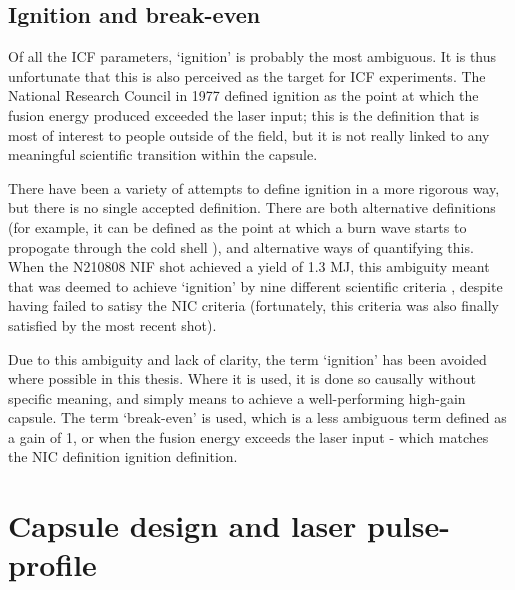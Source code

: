 
\subsection{Ignition and break-even}
Of all the ICF parameters, `ignition' is probably the most ambiguous. It is thus unfortunate that this is also perceived as the target for ICF experiments. The National Research Council in 1977 defined ignition as the point at which the fusion energy produced exceeded the laser input; this is the definition that is most of interest to people outside of the field, but it is not really linked to any meaningful scientific transition within the capsule.

There have been a variety of attempts to define ignition in a more rigorous way, but there is no single accepted definition. There are both alternative definitions (for example, it can be defined as the point at which a burn wave starts to propogate through the cold shell \cite{Christopherson2020}), and alternative ways of quantifying this. When the N210808 NIF shot achieved a yield of 1.3 MJ, this ambiguity meant that was deemed to achieve `ignition' by nine different scientific criteria \cite{Abu-Shawareb2022}, despite having failed to satisy the NIC criteria (fortunately, this criteria was also finally satisfied by the most recent shot).

Due to this ambiguity and lack of clarity, the term `ignition' has been avoided where possible in this thesis. Where it is used, it is done so causally without specific meaning, and simply means to achieve a well-performing high-gain capsule. The term `break-even' is used, which is a less ambiguous term defined as a gain of 1, or when the fusion energy exceeds the laser input - which matches the NIC definition ignition definition.

\section{Capsule design and laser pulse-profile}

